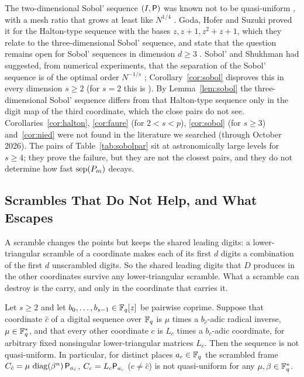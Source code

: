 The two-dimensional Sobol' sequence $(I,\mathsf{P})$ was known not to be quasi-uniform \cite{Goda23}, with a mesh ratio that grows at least like $N^{1/4}$ \cite{Suz25}. Goda, Hofer and Suzuki proved it for the Halton-type sequence with the bases $z,z+1,z^2+z+1$, which they relate to the three-dimensional Sobol' sequence, and state that the question remains open for Sobol' sequences in dimension $d\ge3$ \cite{GHS26}. Sobol' and Shukhman had suggested, from numerical experiments, that the separation of the Sobol' sequence is of the optimal order $N^{-1/s}$ \cite{SS07}; Corollary~\ref{cor:sobol} disproves this in every dimension $s\ge2$ (for $s=2$ this is \cite{Goda23}). By Lemma~\ref{lem:sobol} the three-dimensional Sobol' sequence differs from that Halton-type sequence only in the digit map of the third coordinate, which the close pairs do not see. Corollaries~\ref{cor:halton}, \ref{cor:faure} (for $2<s<p$), \ref{cor:sobol} (for $s\ge3$) and~\ref{cor:nied} were not found in the literature we searched (through October 2026). The pairs of Table~\ref{tab:sobolpar} sit at astronomically large levels for $s\ge4$; they prove the failure, but they are not the closest pairs, and they do not determine how fast $\operatorname{sep}(P_m)$ decays.

\subsection{Scrambles That Do Not Help, and What Escapes}
A scramble changes the points but keeps the shared leading digits: a lower-triangular scramble of a coordinate makes each of its first $d$ digits a combination of the first $d$ unscrambled digits. So the shared leading digits that $D$ produces in the other coordinates survive any lower-triangular scramble. What a scramble can destroy is the carry, and only in the coordinate that carries it.

\begin{corollary}\label{cor:unscrambled}
Let $s\ge2$ and let $b_0,\dots,b_{s-1}\in\mathbb{F}_q[z]$ be pairwise coprime. Suppose that coordinate $\hat c$ of a digital sequence over $\mathbb{F}_q$ is $\mu$ times a $b_{\hat c}$-adic radical inverse, $\mu\in\mathbb{F}_q^*$, and that every other coordinate $c$ is $L_c$ times a $b_c$-adic coordinate, for arbitrary fixed nonsingular lower-triangular matrices $L_c$. Then the sequence is not quasi-uniform. In particular, for distinct places $a_c\in\mathbb{F}_q$ the scrambled frame $C_{\hat c}=\mu\,\operatorname{diag}(\beta^n)\,\mathsf{P}_{a_{\hat c}}$, $C_c=L_c\mathsf{P}_{a_c}$ ($c\ne\hat c$) is not quasi-uniform for any $\mu,\beta\in\mathbb{F}_q^*$.
\end{corollary}

